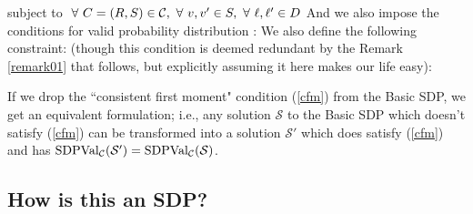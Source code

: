 subject to $\ \forall \  C = (R, S) \in \mathcal{C},\ \forall \  v, v' \in S, \ \forall \  \ell, \ell' \in D $
And we also impose the conditions for valid probability distribution : 
We also define the following constraint: (though this condition is deemed redundant by the Remark \ref{remark01} that follows, but explicitly assuming it here makes our life easy): 

\begin{remark}\label{remark01}
If we drop the ``consistent first moment" condition (\ref{cfm}) from the Basic SDP, we get
an equivalent formulation; i.e., any solution $\mathcal{S}$ to the Basic SDP which doesn't satisfy  (\ref{cfm}) can be transformed into a solution $\mathcal{S}'$ which does satisfy  (\ref{cfm}) and has $\mbox{SDPVal}_{\mathcal{C}}(\mathcal{S}')
= \mbox{SDPVal}_{\mathcal{C}} (\mathcal{S})$.
\end{remark}

\subsection{How is this an SDP?}

